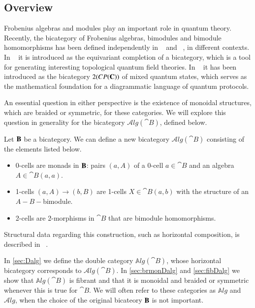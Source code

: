 \documentclass{amsart}
\begin{document}
\subsection{Overview}
Frobenius algebras and modules play an important role in quantum theory. Recently, the bicategory of Frobenius algebras, bimodules and bimodule homomorphisms has been defined independently in ~\cite{carquevillerunkel} and ~\cite{heunenvicarywester}, in different contexts. In ~\cite{carquevillerunkel} it is introduced as the equivariant completion of a bicategory, which is a tool for generating interesting topological quantum field theories. In ~\cite{heunenvicarywester} it has been introduced as the bicategory $2(CP({\bf C}))$ of mixed quantum states, which serves as the mathematical foundation for a diagrammatic language of quantum protocols. 

An essential question in either perspective is the existence of monoidal structures, which are braided or symmetric, for these categories. We will explore this question in generality for the bicategory $\mathcal{A}lg({\cat B})$, defined below.

\begin{defn}
Let ${\bf B}$ be a bicategory. We can define a new bicategory $\mathcal{A}lg({\cat B})$ consisting of the elements listed below.

\begin{itemize}
\item 0-cells are monads in ${\bf B}$: pairs $(a,A)$ of a 0-cell $a \in {\cat B}$ and an algebra $A \in {\cat B}(a,a)$.
\item 1-cells $(a,A) \rightarrow (b,B)$ are 1-cells $X \in {\cat B}(a,b)$ with the structure of an $A-B-$bimodule.
\item 2-cells are 2-morphisms in ${\cat B}$ that are bimodule homomorphisms.
\end{itemize}
Structural data regarding this construction, such as horizontal composition, is described in ~\cite{carquevillerunkel}. 
\end{defn}

In \ref{sec:Dalg} we define the double category $\mathbb{A}lg({\cat B})$, whose horizontal bicategory corresponds to $\mathcal{A}lg({\cat B})$.  In \ref{sec:brmonDalg} and \ref{sec:fibDalg} we show that $\mathbb{A}lg({\cat B})$ is fibrant and that it is monoidal and braided or symmetric whenever this is true for ${\cat B}$. 
We will often refer to these categories as $\mathbb{A}lg$ and $\mathcal{A}lg$, when the choice of the original bicateory ${\bf B}$ is not important.
\end{document}
